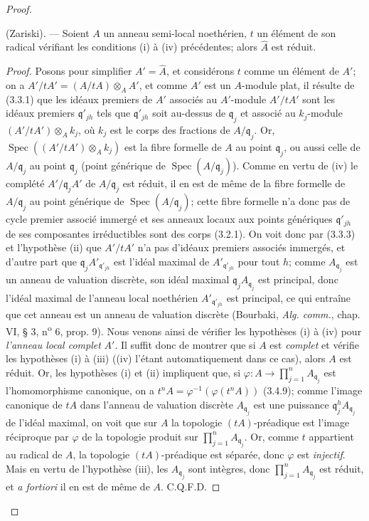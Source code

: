 \begin{proof}
\begin{lemma}[7.6.4.1]
\label{IV.2.s7.6.4.1-fr}
(Zariski). --- Soient $A$ un anneau semi-local noethérien, $t$ un élément de
son radical vérifiant les conditions \textup{(i)} à \textup{(iv)} précédentes; alors
$\widehat A$ est réduit.
\end{lemma}

\begin{proof}
Posons pour simplifier $A'=\widehat A$, et considérons $t$ comme un élément de
$A'$; on a $A'/tA'=(A/tA)\otimes_AA'$, et comme $A'$ est un $A$-module plat,
il résulte de (3.3.1) que les idéaux premiers de $A'$ associés au $A'$-module
$A'/tA'$ sont les idéaux premiers $\mathfrak q'_{jh}$ tels que
$\mathfrak q'_{jh}$ soit au-dessus de $\mathfrak q_j$ et associé au
$k_j$-module $(A'/tA')\otimes_Ak_j$, où $k_j$ est le corps des fractions de
$A/\mathfrak q_j$. Or,
$\operatorname{Spec}((A'/tA')\otimes_Ak_j)$ est la fibre formelle de $A$ au
point $\mathfrak q_j$, ou aussi celle de $A/\mathfrak q_j$ au point
$\mathfrak q_j$ (point générique de
$\operatorname{Spec}(A/\mathfrak q_j)$). Comme en vertu de (iv) le complété
$A'/\mathfrak q_jA'$ de $A/\mathfrak q_j$ est réduit, il en est de même de la
fibre formelle de $A/\mathfrak q_j$ au point générique de
$\operatorname{Spec}(A/\mathfrak q_j)$; cette fibre formelle n'a donc pas de
cycle premier associé immergé et ses anneaux locaux aux points génériques
$\mathfrak q'_{jh}$ de ses composantes irréductibles sont des corps (3.2.1).
On voit donc par (3.3.3) et l'hypothèse (ii) que $A'/tA'$ n'a pas d'idéaux
premiers associés immergés, et d'autre part que
$\mathfrak q_jA'_{\mathfrak q'_{jh}}$ est l'idéal maximal de
$A'_{\mathfrak q'_{jh}}$ pour tout $h$; comme $A_{\mathfrak q_j}$ est un
anneau de valuation discrète, son idéal maximal
$\mathfrak q_jA_{\mathfrak q_j}$ est principal, donc l'idéal maximal de
l'anneau local noethérien $A'_{\mathfrak q'_{jh}}$ est principal, ce qui
entraîne que cet anneau est un anneau de valuation discrète (Bourbaki,
\emph{Alg. comm.}, chap. VI, § 3, n\textsuperscript{o} 6, prop. 9). Nous venons
ainsi de vérifier les hypothèses (i) à (iv) pour \emph{l'anneau local complet} $A'$.
Il suffit donc de montrer que si $A$ est \emph{complet} et vérifie les hypothèses (i)
à (iii) ((iv) l'étant automatiquement dans ce cas), alors $A$ est réduit. Or,
les hypothèses (i) et (ii) impliquent que, si
$\varphi:A\longrightarrow\prod_{j=1}^nA_{\mathfrak q_j}$
est l'homomorphisme canonique, on a
$t^nA=\varphi^{-1}(\varphi(t^nA))$ (3.4.9); comme l'image canonique de $tA$
dans l'anneau de valuation discrète $A_{\mathfrak q_j}$ est une puissance
$\mathfrak q_j^hA_{\mathfrak q_j}$ de l'idéal maximal, on voit que sur $A$ la
topologie $(tA)$-préadique est l'image réciproque par $\varphi$ de la topologie
produit sur $\prod_{j=1}^nA_{\mathfrak q_j}$. Or, comme $t$ appartient au
radical de $A$, la topologie $(tA)$-préadique est séparée, donc $\varphi$ est
\emph{injectif}. Mais en vertu de l'hypothèse (iii), les $A_{\mathfrak q_j}$ sont
intègres, donc $\prod_{j=1}^nA_{\mathfrak q_j}$ est réduit, et \emph{a fortiori} il en
est de même de $A$. C.Q.F.D.
\end{proof}
\end{proof}

